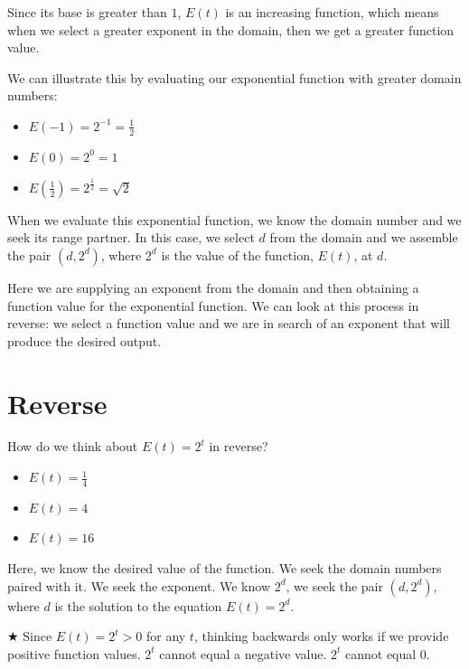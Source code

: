 \documentclass{ximera}
\begin{document}
Since its base is greater than $1$, $E(t)$ is an increasing function, which means when we select a greater exponent in the domain, then we get a greater function value.  



We can illustrate this by evaluating our exponential function with greater domain numbers:
\begin{itemize}
\item $E(-1) = 2^{-1} = \frac{1}{2}$
\item $E(0) = 2^0 = 1$
\item $E\left(\frac{1}{2}\right) = 2^{\tfrac{1}{2}} = \sqrt{2}$
\end{itemize}


When we evaluate this exponential function, we know the domain number and we seek its range partner. In this case, we select $d$ from the domain and we assemble the pair $(d, 2^d)$, where $2^d$ is the value of the function, $E(t)$, at $d$.



Here we are supplying an exponent from the domain and then obtaining a function value for the exponential function.  We can look at this process in reverse: we select a function value and we are in search of an exponent that will produce the desired output.









\section*{Reverse}

How do we think about $E(t) = 2^t$ in reverse?
\begin{itemize}
\item $E(t) = {\tfrac{1}{4}} $
\item $E(t) = 4$
\item $E(t) = 16 $
\end{itemize}


Here, we know the desired value of the function.  We seek the domain numbers paired with it. We seek the exponent. We know $2^d$, we seek the pair $(d, 2^d)$, where $d$ is the solution to the equation $E(t) = 2^d$.




\textbf{\textcolor{red!70!darkgray}{$\bigstar$}}  Since $E(t) = 2^t > 0$ for any $t$, thinking backwards only works if we provide positive function values. $2^t$ cannot equal a negative value. $2^t$ cannot equal $0$.   
\end{document}
